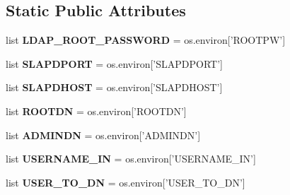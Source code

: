 \subsection*{Static Public Attributes}
\begin{DoxyCompactItemize}
\item 
\hypertarget{classldap_1_1ldap_1_1LDAPConfiguration_a1b68249f32a9990f6f4fb75ff20f88ba}{list {\bfseries L\-D\-A\-P\-\_\-\-R\-O\-O\-T\-\_\-\-P\-A\-S\-S\-W\-O\-R\-D} = os.\-environ\mbox{[}'R\-O\-O\-T\-P\-W'\mbox{]}}\label{classldap_1_1ldap_1_1LDAPConfiguration_a1b68249f32a9990f6f4fb75ff20f88ba}

\item 
\hypertarget{classldap_1_1ldap_1_1LDAPConfiguration_a187f1bd89a4bbc7d7cbb9aa9f0431f2f}{list {\bfseries S\-L\-A\-P\-D\-P\-O\-R\-T} = os.\-environ\mbox{[}'S\-L\-A\-P\-D\-P\-O\-R\-T'\mbox{]}}\label{classldap_1_1ldap_1_1LDAPConfiguration_a187f1bd89a4bbc7d7cbb9aa9f0431f2f}

\item 
\hypertarget{classldap_1_1ldap_1_1LDAPConfiguration_a6f7c3a9f138dc9697ca5494d322808a3}{list {\bfseries S\-L\-A\-P\-D\-H\-O\-S\-T} = os.\-environ\mbox{[}'S\-L\-A\-P\-D\-H\-O\-S\-T'\mbox{]}}\label{classldap_1_1ldap_1_1LDAPConfiguration_a6f7c3a9f138dc9697ca5494d322808a3}

\item 
\hypertarget{classldap_1_1ldap_1_1LDAPConfiguration_a73e91ac4ac6d5d2ae4f30dc97d70e433}{list {\bfseries R\-O\-O\-T\-D\-N} = os.\-environ\mbox{[}'R\-O\-O\-T\-D\-N'\mbox{]}}\label{classldap_1_1ldap_1_1LDAPConfiguration_a73e91ac4ac6d5d2ae4f30dc97d70e433}

\item 
\hypertarget{classldap_1_1ldap_1_1LDAPConfiguration_a5d2425ffe420acb07721f6bbc8514656}{list {\bfseries A\-D\-M\-I\-N\-D\-N} = os.\-environ\mbox{[}'A\-D\-M\-I\-N\-D\-N'\mbox{]}}\label{classldap_1_1ldap_1_1LDAPConfiguration_a5d2425ffe420acb07721f6bbc8514656}

\item 
\hypertarget{classldap_1_1ldap_1_1LDAPConfiguration_ae7bfc302e4a58797cfcd52d91c73d197}{list {\bfseries U\-S\-E\-R\-N\-A\-M\-E\-\_\-\-I\-N} = os.\-environ\mbox{[}'U\-S\-E\-R\-N\-A\-M\-E\-\_\-\-I\-N'\mbox{]}}\label{classldap_1_1ldap_1_1LDAPConfiguration_ae7bfc302e4a58797cfcd52d91c73d197}

\item 
\hypertarget{classldap_1_1ldap_1_1LDAPConfiguration_aa4631e2781b16bd84dba30eff70acb24}{list {\bfseries U\-S\-E\-R\-\_\-\-T\-O\-\_\-\-D\-N} = os.\-environ\mbox{[}'U\-S\-E\-R\-\_\-\-T\-O\-\_\-\-D\-N'\mbox{]}}\label{classldap_1_1ldap_1_1LDAPConfiguration_aa4631e2781b16bd84dba30eff70acb24}

\end{DoxyCompactItemize}


